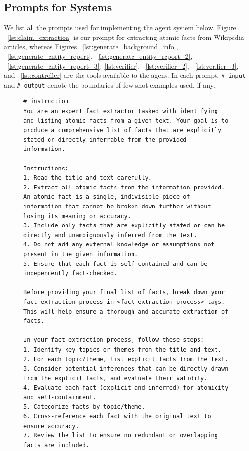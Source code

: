 \subsection{Prompts for Systems}

We list all the prompts used for implementing the agent system below. Figure ~\ref{lst:claim_extraction} is our prompt for extracting atomic facts from Wikipedia articles, whereas Figures ~\ref{lst:generate_background_info}, ~\ref{lst:generate_entity_report}, ~\ref{lst:generate_entity_report_2}, ~\ref{lst:generate_entity_report_3},~\ref{lst:verifier}, ~\ref{lst:verifier_2}, ~\ref{lst:verifier_3}, and ~\ref{lst:controller} are the tools available to the \system agent.
In each prompt, \texttt{\# input} and \texttt{\# output} denote the boundaries of few-shot examples used, if any.

\begin{figure}[htb]
\begin{lstlisting}
# instruction
You are an expert fact extractor tasked with identifying and listing atomic facts from a given text. Your goal is to produce a comprehensive list of facts that are explicitly stated or directly inferrable from the provided information.

Instructions:
1. Read the title and text carefully.
2. Extract all atomic facts from the information provided. An atomic fact is a single, indivisible piece of information that cannot be broken down further without losing its meaning or accuracy.
3. Include only facts that are explicitly stated or can be directly and unambiguously inferred from the text.
4. Do not add any external knowledge or assumptions not present in the given information.
5. Ensure that each fact is self-contained and can be independently fact-checked.

Before providing your final list of facts, break down your fact extraction process in <fact_extraction_process> tags. This will help ensure a thorough and accurate extraction of facts.

In your fact extraction process, follow these steps:
1. Identify key topics or themes from the title and text.
2. For each topic/theme, list explicit facts from the text.
3. Consider potential inferences that can be directly drawn from the explicit facts, and evaluate their validity.
4. Evaluate each fact (explicit and inferred) for atomicity and self-containment.
5. Categorize facts by topic/theme.
6. Cross-reference each fact with the original text to ensure accuracy.
7. Review the list to ensure no redundant or overlapping facts are included.


\end{lstlisting}
\end{figure}
